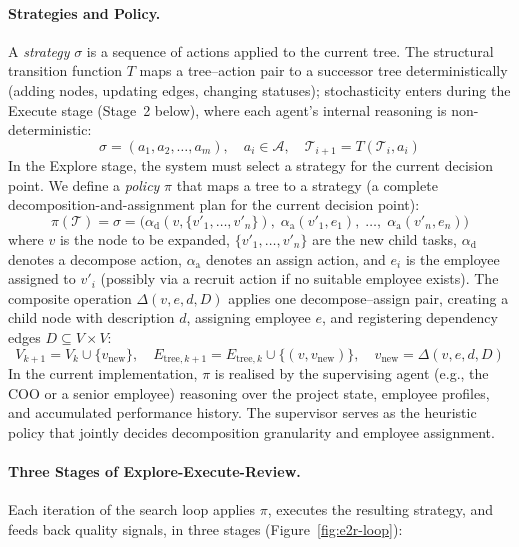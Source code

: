 \documentclass[11pt,a4paper]{article}
\begin{document}
\paragraph{Strategies and Policy.}
A \emph{strategy} $\sigma$ is a sequence of actions applied to the current tree.  The structural transition function $T$ maps a tree--action pair to a successor tree deterministically (adding nodes, updating edges, changing statuses); stochasticity enters during the Execute stage (Stage~2 below), where each agent's internal reasoning is non-deterministic:
\begin{equation}
\sigma = (a_1, a_2, \ldots, a_m), \quad a_i \in \mathcal{A}, \quad \mathcal{T}_{i+1} = T(\mathcal{T}_i, a_i)
\end{equation}
In the Explore stage, the system must select a strategy for the current decision point.  We define a \emph{policy} $\pi$ that maps a tree to a strategy (a complete decomposition-and-assignment plan for the current decision point):
\begin{equation}
\pi(\mathcal{T}) = \sigma = \bigl(\alpha_{\text{d}}(v, \{v'_1, \ldots, v'_n\}),\; \alpha_{\text{a}}(v'_1, e_1),\; \ldots,\; \alpha_{\text{a}}(v'_n, e_n)\bigr)
\end{equation}
where $v$ is the node to be expanded, $\{v'_1, \ldots, v'_n\}$ are the new child tasks, $\alpha_{\text{d}}$ denotes a decompose action, $\alpha_{\text{a}}$ denotes an assign action, and $e_i$ is the employee assigned to $v'_i$ (possibly via a recruit action if no suitable employee exists).  The composite operation $\Delta(v, e, d, D)$ applies one decompose--assign pair, creating a child node with description $d$, assigning employee $e$, and registering dependency edges $D \subseteq V \times V$:
\begin{equation}
V_{k+1} = V_k \cup \{v_{\text{new}}\}, \quad E_{\text{tree},k+1} = E_{\text{tree},k} \cup \{(v, v_{\text{new}})\}, \quad v_{\text{new}} = \Delta(v, e, d, D)
\end{equation}
In the current implementation, $\pi$ is realised by the supervising agent (e.g., the COO or a senior employee) reasoning over the project state, employee profiles, and accumulated performance history.  The supervisor serves as the heuristic policy that jointly decides decomposition granularity and employee assignment.

\paragraph{Three Stages of Explore-Execute-Review.} Each iteration of the search loop applies $\pi$, executes the resulting strategy, and feeds back quality signals, in three stages (Figure~\ref{fig:e2r-loop}):
\end{document}
